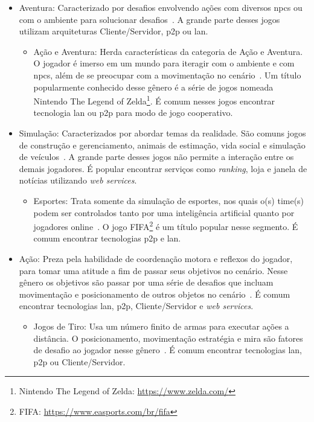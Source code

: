 \begin{itemize}
\begin{itemize}
    \end{itemize}
  \item Aventura: Caracterizado por desafios envolvendo ações com diversos \ac{npcs} ou com o ambiente para solucionar desafios~\cite{adams_1208533}. A grande parte desses jogos utilizam arquiteturas Cliente/Servidor, \ac{p2p} ou \ac{lan}.
    \begin{itemize}
      \item Ação e Aventura: Herda características da categoria de Ação e Aventura. O jogador é imerso em um mundo para iteragir com o ambiente e com \ac{npcs}, além de se preocupar com a movimentação no cenário~\cite{adams_1208533}. Um título popularmente conhecido desse gênero é a série de jogos nomeada Nintendo The Legend of Zelda\footnote{Nintendo The Legend of Zelda: \url{https://www.zelda.com/}}. É comum nesses jogos encontrar tecnologia \ac{lan} ou \ac{p2p} para modo de jogo cooperativo.
    \end{itemize}
  \item Simulação: Caracterizados por abordar temas da realidade. São comuns jogos de construção e gerenciamento, animais de estimação, vida social e simulação de veículos~\cite{adams_1208533}. A grande parte desses jogos não permite a interação entre os demais jogadores. É popular encontrar serviços como \textit{ranking}, loja e janela de notícias utilizando \textit{web services}.
    \begin{itemize}
      \item Esportes: Trata somente da simulação de esportes, nos quais o(s) time(s) podem ser controlados tanto por uma inteligência artificial quanto por jogadores online~\cite{adams_1208533}. O jogo FIFA\footnote{FIFA: \url{https://www.easports.com/br/fifa}} é um título popular nesse segmento. É comum encontrar tecnologias \ac{p2p} e \ac{lan}.
    \end{itemize}
  \item Ação: Preza pela habilidade de coordenação motora e reflexos do jogador, para tomar uma atitude a fim de passar seus objetivos no cenário. Nesse gênero os objetivos são passar por uma série de desafios que incluam movimentação e posicionamento de outros objetos no cenário~\cite{adams_1208533}. É comum encontrar tecnologias \ac{lan}, \ac{p2p}, Cliente/Servidor e \textit{web services}.
    \begin{itemize}
      \item Jogos de Tiro: Usa um número finito de armas para executar ações a distância. O posicionamento, movimentação estratégia e mira são fatores de desafio ao jogador nesse gênero~\cite{adams_1208533}. É comum encontrar tecnologias \ac{lan}, \ac{p2p} ou Cliente/Servidor.

\end{itemize}
\end{itemize}
